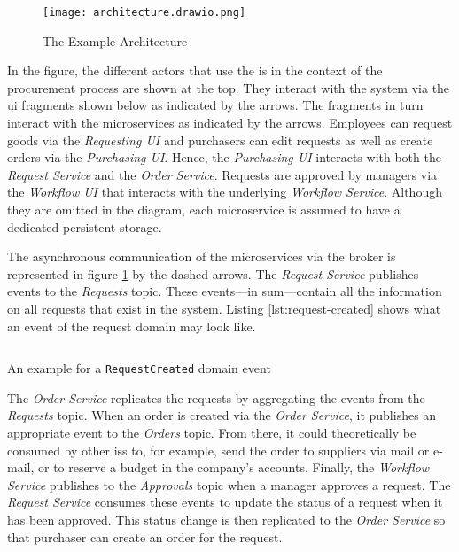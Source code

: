 \begin{figure}[H]
  \centering
  \texttt{[image: architecture.drawio.png]}
  \caption{The Example Architecture}\label{fig:example-architecture}
\end{figure}

In the figure, the different actors that use the \gls{is} in the context of the procurement process are shown at the top.
They interact with the system via the \gls{ui} fragments shown below as indicated by the arrows.
The fragments in turn interact with the microservices as indicated by the arrows.
Employees can request goods via the \emph{Requesting UI} and purchasers can edit requests as well as create orders via the \emph{Purchasing UI}.
Hence, the \emph{Purchasing UI} interacts with both the \emph{Request Service} and the \emph{Order Service}.
Requests are approved by managers via the \emph{Workflow UI} that interacts with the underlying \emph{Workflow Service}.
Although they are omitted in the diagram, each microservice is assumed to have a dedicated persistent storage.

The asynchronous communication of the microservices via the broker is represented in figure \ref{fig:example-architecture} by the dashed arrows.
The \emph{Request Service} publishes events to the \emph{Requests} topic.
These events---in sum---contain all the information on all requests that exist in the system.
Listing \ref{lst:request-created} shows what an event of the request domain may look like.

\begin{listing}[h]
  \inputminted{json}{assets/src/request-created.json}
  \caption{An example for a \texttt{RequestCreated} domain event}\label{lst:request-created}
\end{listing}

The \emph{Order Service} replicates the requests by aggregating the events from the \emph{Requests} topic.
When an order is created via the \emph{Order Service}, it publishes an appropriate event to the \emph{Orders} topic.
From there, it could theoretically be consumed by other \glspl{is} to, for example, send the order to suppliers via mail or e-mail, or to reserve a budget in the company's accounts.
Finally, the \emph{Workflow Service} publishes to the \emph{Approvals} topic when a manager approves a request.
The \emph{Request Service} consumes these events to update the status of a request when it has been approved.
This status change is then replicated to the \emph{Order Service} so that purchaser can create an order for the request.

